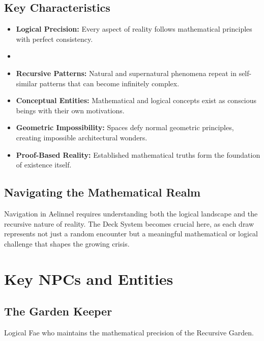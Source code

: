 \documentclass[11pt]{article}
\begin{document}
\subsection{Key Characteristics}

\begin{itemize}
\item \textbf{Logical Precision:} Every aspect of reality follows mathematical principles with perfect consistency.
\item \item \textbf{Recursive Patterns:} Natural and supernatural phenomena repeat in self-similar patterns that can become infinitely complex.
\item \textbf{Conceptual Entities:} Mathematical and logical concepts exist as conscious beings with their own motivations.
\item \textbf{Geometric Impossibility:} Spaces defy normal geometric principles, creating impossible architectural wonders.
\item \textbf{Proof-Based Reality:} Established mathematical truths form the foundation of existence itself.
\end{itemize}

\subsection{Navigating the Mathematical Realm}

Navigation in Aelinnel requires understanding both the logical landscape and the recursive nature of reality. The Deck System becomes crucial here, as each draw represents not just a random encounter but a meaningful mathematical or logical challenge that shapes the growing crisis.

\section{Key NPCs and Entities}

\subsection{The Garden Keeper}

Logical Fae who maintains the mathematical precision of the Recursive Garden.
\end{document}
